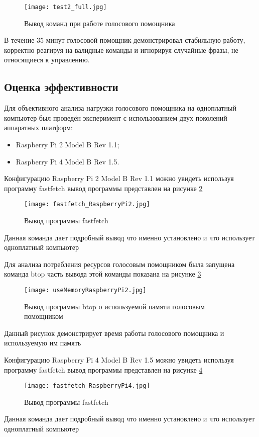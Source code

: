 \begin{figure}[H]
	\centering
	\texttt{[image: test2\_full.jpg]}
	\caption{Вывод команд при работе голосового помощника}
	\label{fig:test2}
\end{figure}
В течение 35 минут голосовой помощник демонстрировал стабильную работу, корректно реагируя на валидные команды и игнорируя случайные фразы, не относящиеся к управлению.

\subsection{Оценка эффективности}

Для объективного анализа нагрузки голосового помощника на одноплатный компьютер был проведён эксперимент с использованием двух поколений аппаратных платформ:
\begin{itemize}
	\item Raspberry Pi 2 Model B Rev 1.1;
	\item Raspberry Pi 4 Model B Rev 1.5.
\end{itemize}

Конфигурацию Raspberry Pi 2 Model B Rev 1.1 можно увидеть используя программу fastfetch вывод программы представлен на рисунке \ref{fig:fastfetch_RaspberryPi2}

\begin{figure}[H]
	\centering
	\texttt{[image: fastfetch\_RaspberryPi2.jpg]}
	\caption{Вывод программы fastfetch}
	\label{fig:fastfetch_RaspberryPi2}
\end{figure}
Данная команда дает подробный вывод что именно установлено и что использует одноплатный компьютер

Для анализа потребления ресурсов голосовым помощником была запущена команда btop часть вывода этой команды показана на рисунке \ref{fig:useMemoryRaspberryPi2}

\begin{figure}[H]
	\centering
	\texttt{[image: useMemoryRaspberryPi2.jpg]}
	\caption{Вывод программы btop о используемой памяти голосовым помощником}
	\label{fig:useMemoryRaspberryPi2}
\end{figure}
Данный рисунок демонстрирует время работы голосового помощника и используемую им память 

Конфигурацию Raspberry Pi 4 Model B Rev 1.5 можно увидеть используя программу fastfetch вывод программы представлен на рисунке \ref{fig:fastfetch_RaspberryPi4}

\begin{figure}[H]
	\centering
	\texttt{[image: fastfetch\_RaspberryPi4.jpg]}
	\caption{Вывод программы fastfetch}
	\label{fig:fastfetch_RaspberryPi4}
\end{figure}
Данная команда дает подробный вывод что именно установлено и что использует одноплатный компьютер

